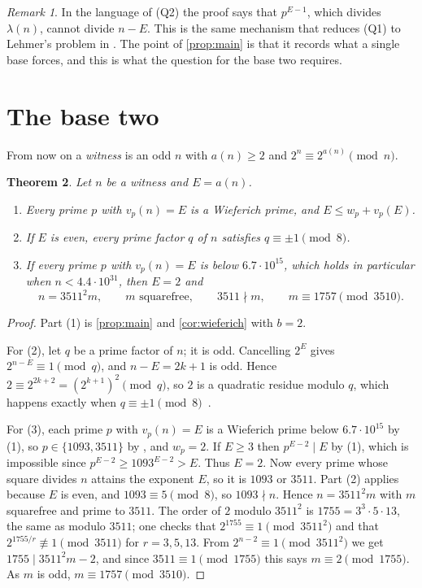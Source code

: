 \documentclass[11pt]{amsart}
\newtheorem{theorem}{Theorem}
\theoremstyle{remark}
\newtheorem{remark}[theorem]{Remark}
\newcommand{\vp}{v_p}
\begin{document}
\begin{remark}
In the language of (Q2) the proof says that $p^{E-1}$, which divides $\lambda(n)$, cannot
divide $n-E$. This is the same mechanism that reduces (Q1) to Lehmer's problem in
\cite{formalconj}. The point of \cref{prop:main} is that it records what a single base
forces, and this is what the question for the base two requires.
\end{remark}

\section{The base two}\label{sec:base2}

From now on a \emph{witness} is an odd $n$ with $a(n)\ge 2$ and $2^{n}\equiv
2^{a(n)}\pmod n$.

\begin{theorem}\label{thm:shape}
Let $n$ be a witness and $E=a(n)$.
\begin{enumerate}
\item Every prime $p$ with $\vp(n)=E$ is a Wieferich prime, and $E\le w_p+\vp(E)$.
\item If $E$ is even, every prime factor $q$ of $n$ satisfies $q\equiv\pm1\pmod 8$.
\item If every prime $p$ with $\vp(n)=E$ is below $6.7\cdot 10^{15}$, which holds in
particular when $n<4.4\cdot 10^{31}$, then $E=2$ and
\[
n=3511^{2}m,\qquad m \text{ squarefree},\qquad 3511\nmid m,\qquad m\equiv 1757\pmod{3510}.
\]
\end{enumerate}
\end{theorem}

\begin{proof}
Part (1) is \cref{prop:main} and \cref{cor:wieferich} with $b=2$.

For (2), let $q$ be a prime factor of $n$; it is odd. Cancelling $2^{E}$ gives
$2^{n-E}\equiv1\pmod q$, and $n-E=2k+1$ is odd. Hence $2\equiv 2^{2k+2}=(2^{k+1})^{2}\pmod
q$, so $2$ is a quadratic residue modulo $q$, which happens exactly when $q\equiv\pm1\pmod
8$~\cite[Ch.~5]{irelandrosen}.

For (3), each prime $p$ with $\vp(n)=E$ is a Wieferich prime below $6.7\cdot10^{15}$ by (1),
so $p\in\{1093,3511\}$ by \cite{doraisklyve}, and $w_p=2$. If $E\ge3$ then $p^{E-2}\mid E$
by (1), which is impossible since $p^{E-2}\ge 1093^{E-2}>E$. Thus $E=2$. Now every prime whose square divides $n$
attains the exponent $E$, so it is $1093$ or $3511$. Part (2) applies because $E$ is even,
and $1093\equiv 5\pmod 8$, so $1093\nmid n$. Hence $n=3511^{2}m$ with $m$ squarefree and
prime to $3511$. The order of $2$ modulo $3511^{2}$ is $1755=3^{3}\cdot5\cdot13$, the same as
modulo $3511$; one checks that $2^{1755}\equiv1\pmod{3511^{2}}$ and that $2^{1755/r}\not\equiv
1\pmod{3511}$ for $r=3,5,13$. From $2^{n-2}\equiv1\pmod{3511^{2}}$ we get $1755\mid
3511^{2}m-2$, and since $3511\equiv1\pmod{1755}$ this says $m\equiv2\pmod{1755}$. As $m$ is
odd, $m\equiv1757\pmod{3510}$.
\end{proof}
\end{document}
